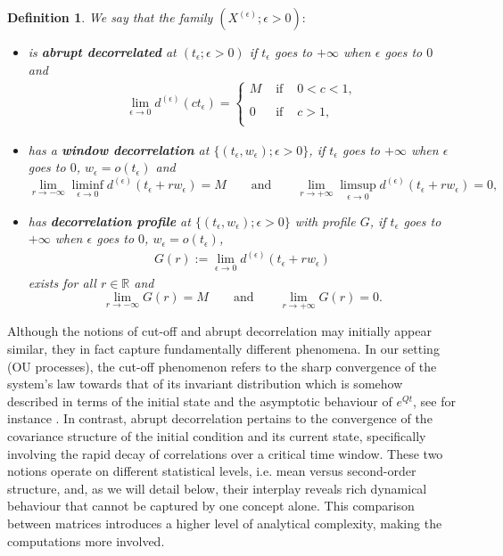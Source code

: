 \documentclass[12pt,thmsa]{article}
\newtheorem{defi}{Definition}
\begin{document}
\begin{defi}\label{abdeco}
We say that the family $(X^{(\epsilon)}; \epsilon>0):$ 
\begin{itemize}
	\item[i)] is {\bf abrupt decorrelated} at $(t_{\epsilon}; \epsilon>0)$  if $t_{\epsilon}$ goes to $+\infty$ when $\epsilon$ goes to $0$ and
	\begin{eqnarray*}
		\lim\limits_{\epsilon\rightarrow 0 }{d^{(\epsilon)}(ct_{\epsilon})}= \left\{ \begin{array}{lcc}
			M &  \textrm{ if }  & 0 < c < 1, \\
			\\ 0 & \textrm{ if } & c>1, \\
		\end{array}
		\right.
	\end{eqnarray*}
	\item[ii)] has a {\bf window decorrelation} at
	$\{\left(t_{\epsilon}, w_{\epsilon}\right); \epsilon>0\}$, if $t_{\epsilon}$ goes to $+\infty$ when $\epsilon$ goes to $0$, $w_{\epsilon}=o\left(t_{\epsilon}\right)$ and
	\[
	\lim\limits_{r \rightarrow -\infty}{\liminf\limits_{\epsilon\rightarrow 0}
		{d^{(\epsilon)}(t_{\epsilon}+rw_{\epsilon})}}=M\qquad \textrm{and} \qquad  \lim\limits_{r \rightarrow +\infty}{\limsup\limits_{\epsilon\rightarrow 0}
		{d^{(\epsilon)}(t_{\epsilon}+rw_{\epsilon})}}=0,
	\]
	\item[iii)] has {\bf decorrelation profile}  at
	$\{\left(t_{\epsilon}, w_{\epsilon}\right); \epsilon>0\}$ with profile $G$, if $t_{\epsilon}$ goes to $+\infty$ when $\epsilon$ goes to $0$, $w_{\epsilon}=o\left(t_{\epsilon}\right)$,
	\begin{eqnarray*}
		G(r):=\lim\limits_{\epsilon \rightarrow 0}{d^{(\epsilon)}(t_{\epsilon}+rw_{\epsilon})}
	\end{eqnarray*} exists for all $r\in \mathbb{R}$ and
	\[
	\lim\limits_{r \rightarrow -\infty}{G(r)}=M\qquad \textrm{and} \qquad \lim\limits_{r \rightarrow +\infty}{G(r)}=0.
	\]
\end{itemize}
\end{defi}

Although the notions of cut-off and abrupt decorrelation may initially appear similar, they in fact capture fundamentally different phenomena. In our setting (OU processes), the cut-off phenomenon refers to the sharp convergence  of the system's law towards that of its invariant distribution which is somehow described in terms of the initial state and the asymptotic behaviour of $e^{Qt}$, see for instance \cite{BJ, BJ1}. In contrast, abrupt decorrelation pertains to the convergence of the covariance structure of the initial condition and its current state, specifically involving the rapid decay of correlations over a critical time window. These two notions operate on different statistical levels, i.e. mean versus second-order structure, and, as we will detail below, their interplay reveals rich dynamical behaviour that cannot be captured by one concept alone. This comparison between matrices introduces a higher level of analytical complexity, making the computations more involved.
\end{document}
